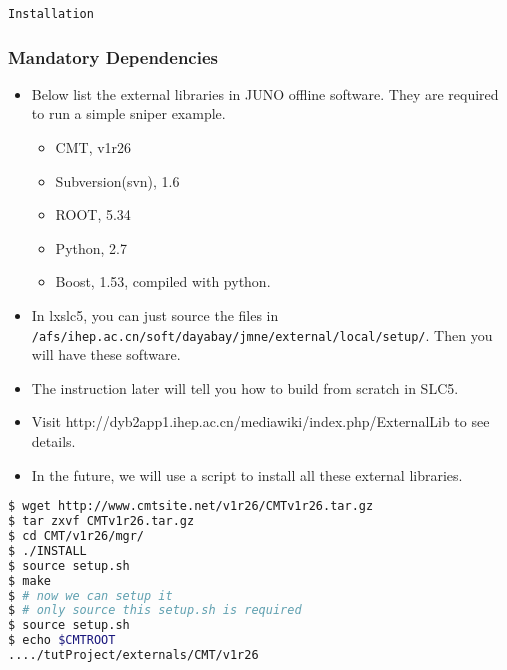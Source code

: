 \begin{frame}
    \begin{center}
        \LARGE \tt{Installation}
    \end{center}
\end{frame}

\begin{frame}
    \frametitle{Mandatory Dependencies}
\begin{itemize}
    \item Below list the external libraries in JUNO offline software.
    They are required to run a simple sniper example.
    \begin{itemize}
        \item CMT, v1r26
        \item Subversion(svn), 1.6
        \item ROOT, 5.34
        \item Python, 2.7
        \item Boost, 1.53, compiled with python.
    \end{itemize}
    \item In lxslc5, you can just source the files in
    {\tt /afs/ihep.ac.cn/soft/dayabay/jmne/external/local/setup/}.
    Then you will have these software.
    \item The instruction later will tell you how to build from scratch
    in SLC5.
    \item Visit http://dyb2app1.ihep.ac.cn/mediawiki/index.php/ExternalLib
    to see details.
    \item In the future, we will use a script to install all these external
    libraries.
\end{itemize}
\end{frame}

\newsavebox{\installcmt}
\begin{lrbox}{\installcmt}
\begin{lstlisting}[language=bash]
$ wget http://www.cmtsite.net/v1r26/CMTv1r26.tar.gz
$ tar zxvf CMTv1r26.tar.gz 
$ cd CMT/v1r26/mgr/
$ ./INSTALL 
$ source setup.sh 
$ make
$ # now we can setup it
$ # only source this setup.sh is required
$ source setup.sh 
$ echo $CMTROOT 
..../tutProject/externals/CMT/v1r26
\end{lstlisting}
\end{lrbox}

